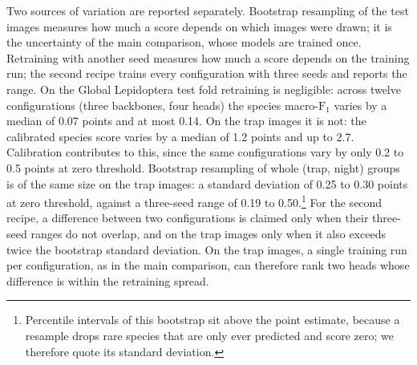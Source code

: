 Two sources of variation are reported separately.
Bootstrap resampling of the test images measures how much a score depends on which images were drawn; it is the uncertainty of the main comparison, whose models are trained once.
Retraining with another seed measures how much a score depends on the training run; the second recipe trains every configuration with three seeds and reports the range.
On the Global Lepidoptera test fold retraining is negligible: across twelve configurations (three backbones, four heads) the species macro-$\text{F}_1$ varies by a median of 0.07 points and at most 0.14.
On the trap images it is not: the calibrated species score varies by a median of 1.2 points and up to 2.7.
Calibration contributes to this, since the same configurations vary by only 0.2 to 0.5 points at zero threshold.
Bootstrap resampling of whole (trap, night) groups is of the same size on the trap images: a standard deviation of 0.25 to 0.30 points at zero threshold, against a three-seed range of 0.19 to 0.50.\footnote{Percentile intervals of this bootstrap sit above the point estimate, because a resample drops rare species that are only ever predicted and score zero; we therefore quote its standard deviation.}
For the second recipe, a difference between two configurations is claimed only when their three-seed ranges do not overlap, and on the trap images only when it also exceeds twice the bootstrap standard deviation.
On the trap images, a single training run per configuration, as in the main comparison, can therefore rank two heads whose difference is within the retraining spread.
